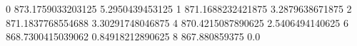 0 873.1759033203125 5.2950439453125
1 871.1688232421875 3.2879638671875
2 871.1837768554688 3.30291748046875
4 870.4215087890625 2.5406494140625
6 868.7300415039062 0.84918212890625
8 867.880859375 0.0
